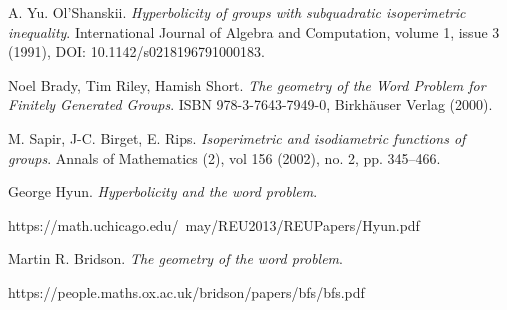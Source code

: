 \documentclass[licencjacka]{pracamgr}
\begin{document}
\begin{thebibliography}{99}

 A. Yu. Ol'Shanskii. 
\textit{Hyperbolicity of groups with subquadratic isoperimetric inequality}. 
International Journal of Algebra and Computation, volume 1, issue 3 (1991), DOI: 10.1142/s0218196791000183.

 Noel Brady, Tim Riley, Hamish Short. 
\textit{The geometry of the Word Problem for Finitely Generated Groups}. 
ISBN 978-3-7643-7949-0, Birkhäuser Verlag (2000).

 M. Sapir, J-C. Birget, E. Rips. 
\textit{Isoperimetric and isodiametric functions of groups}. 
Annals of Mathematics (2), vol 156 (2002), no. 2, pp. 345–466.

 George Hyun. 
\textit{Hyperbolicity and the word problem}. 

https://math.uchicago.edu/~may/REU2013/REUPapers/Hyun.pdf

 Martin R. Bridson. 
\textit{The geometry of the word problem}.

https://people.maths.ox.ac.uk/bridson/papers/bfs/bfs.pdf

\end{thebibliography}
\end{document}
